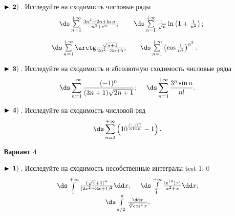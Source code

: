 $\bf\blacktriangleright\,2)\,$. Исследуйте на сходимость числовые ряды
\begin{equation*}
    \begin{array}{ccc}
        \,
\ds\sum\limits_{n=1}^{+\infty}\frac{3n^2+2n+\ln n}{n^3+e^n}

        ; &   \,
\ds\sum\limits_{n=1}^{+\infty}\frac{1}{\sqrt{n}}\ln\left(1+\frac{1}{n^2}\right)

        ; \\[6mm]
        \,
\ds\sum\limits_{n=1}^{+\infty}\arctg\frac{\sqrt{n+1}}{2n^2-3n+5}

        ; &    \,
\ds\sum\limits_{n=1}^{+\infty}\left(\cos\frac{1}{n^2}\right)^{n^5}

        .
    \end{array}
\end{equation*}


$\bf\blacktriangleright\,3)\,$. Исследуйте на сходимость и абсолютную сходимость числовые ряды
\begin{equation*}
    \,
\ds\sum\limits_{n=1}^{+\infty}\frac{(-1)^n}{(3n+1)\sqrt{2n+1}}

    ;\quad\,   \,
\ds\sum\limits_{n=1}^{+\infty}\frac{3^n\sin n}{n!}

    .
\end{equation*}


$\bf\blacktriangleright\,4)\,$. Исследуйте на сходимость числовой ряд
\begin{equation*}
    \,
\ds\sum\limits_{n=2}^{+\infty}\left(10^{\frac{(-1)^n}{n\ln n}}-1\right)
    .
\end{equation*}

\centerline{\bf\Large Вариант 4}


$\bf\blacktriangleright\,1)\,$. Исследуйте на сходимость несобственные интегралы test 1; 0
\begin{equation*}
\begin{array}{cc}
  \,
\ds\int\limits_{1}^{+\infty} \frac{(\sqrt{x}+1)^4}{(2x^2+3x+1)^2}\dd x

  ;\quad\,    \,
\ds\int\limits_{1}^{+\infty} \frac{\ln^{10}(x)}{x^2+x}\dd x

  ;\\
  \,
\ds\int\limits_{\pi/2}^{\pi}\frac{\dd x}{\sqrt[3]{\cos^4 x}}

  .
\end{array}
\end{equation*}


